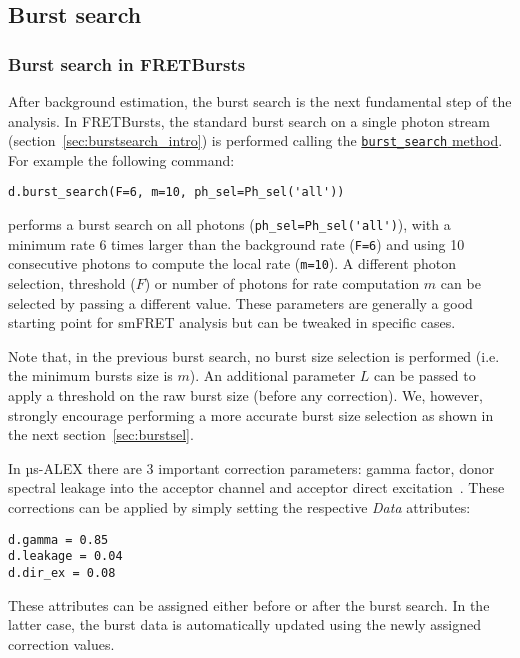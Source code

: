 \subsection{Burst search}
\label{sec:burstsearch}

\subsubsection{Burst search in FRETBursts}
\label{sec:burstsearch_code}

After background estimation, the burst search is the next fundamental step of
the analysis.
In FRETBursts, the standard burst search on a single photon stream (section~\ref{sec:burstsearch_intro}) is performed calling the
\href{http://fretbursts.readthedocs.org/en/latest/data\_class.html#fretbursts.burstlib.Data.burst\_search}{\texttt{burst\_search} method}. For example the following command:

\begin{verbatim}
d.burst_search(F=6, m=10, ph_sel=Ph_sel('all'))
\end{verbatim}

performs a burst search on all photons
(\verb|ph_sel=Ph_sel('all')|), with a minimum rate 6 times larger than the
background rate (\verb|F=6|) and using 10 consecutive photons to compute the
local rate (\verb|m=10|).
A different photon selection, threshold ($F$) or number of photons for rate
computation $m$ can be selected by passing a different value. These parameters
are generally a good starting point for smFRET analysis but can be tweaked in
specific cases.

Note that, in the previous burst search, no burst size selection is performed
(i.e. the minimum bursts size is $m$). 
An additional parameter $L$ can be passed to apply a threshold on the raw burst
size (before any correction). 
We, however, strongly encourage performing a more accurate burst size selection as shown in
the next section~\ref{sec:burstsel}.

In µs-ALEX there are 3 important correction parameters: gamma factor, donor spectral
leakage into the acceptor channel and acceptor direct excitation~\cite{Lee_2005}. 
These corrections can be applied by simply setting the respective \textit{Data} attributes:

\begin{verbatim}
d.gamma = 0.85
d.leakage = 0.04
d.dir_ex = 0.08
\end{verbatim}

These attributes can be assigned either before or after the burst search. In the
latter case, the burst data is
automatically updated using the newly assigned correction values.

